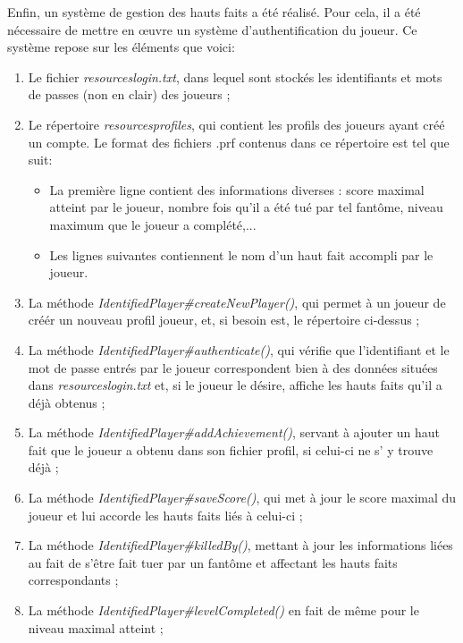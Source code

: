\documentclass[12pt, openany]{report}
\begin{document}
Enfin, un système de gestion des hauts faits a été réalisé. Pour cela, il a été nécessaire de mettre en œuvre un système d'authentification du joueur.
Ce système repose sur les éléments que voici:

\begin{enumerate}
\item Le fichier \mbox{\textit{resources\\login.txt}}, dans lequel sont stockés les identifiants et mots de passes (non en clair) des joueurs ;
\item Le répertoire \mbox{\textit{resources\\profiles\\}}, qui contient les profils des joueurs ayant créé un compte.
Le format des fichiers .prf contenus dans ce répertoire est tel que suit: 
\begin{itemize}
\item La première ligne contient des informations diverses : score maximal atteint par le joueur, nombre fois qu'il a été tué par tel fantôme, niveau maximum que le joueur a complété,...
\item Les lignes suivantes contiennent le nom d'un haut fait accompli par le joueur.
\end{itemize}
\item La méthode \mbox{\textit{IdentifiedPlayer\#createNewPlayer()}}, qui permet à un joueur de créér un nouveau profil joueur, et, si besoin est, le répertoire ci-dessus ;
\item La méthode \mbox{\textit{IdentifiedPlayer\#authenticate()}}, qui vérifie que l'identifiant et le mot de passe entrés par le joueur correspondent bien à des données situées dans \mbox{\textit{resources\\login.txt}} et, si le joueur le désire, affiche les hauts faits qu'il a déjà obtenus ;
\item La méthode \mbox{\textit{IdentifiedPlayer\#addAchievement()}}, servant à ajouter un haut fait que le joueur a obtenu dans son fichier profil, si celui-ci ne s' y trouve déjà ;
\item La méthode \mbox{\textit{IdentifiedPlayer\#saveScore()}}, qui met à jour le score maximal du joueur et lui accorde les hauts faits liés à celui-ci ;
\item La méthode \mbox{\textit{IdentifiedPlayer\#killedBy()}}, mettant à jour les informations liées au fait de s'être fait tuer par un fantôme et affectant les hauts faits correspondants ;
\item La méthode \mbox{\textit{IdentifiedPlayer\#levelCompleted()}} en fait de même pour le niveau maximal atteint ;

\end{enumerate}
\end{document}
